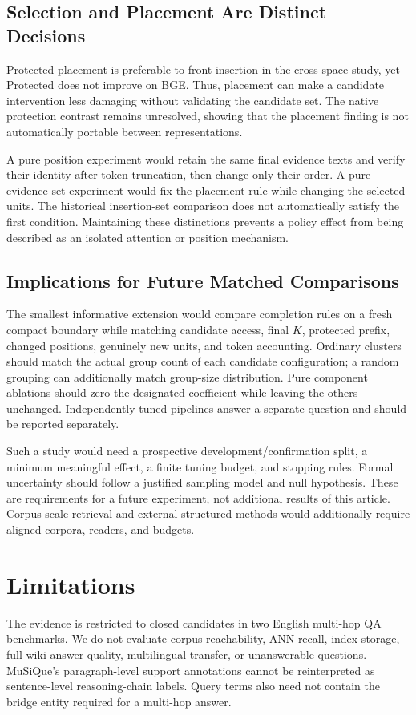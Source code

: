\documentclass[11pt,a4paper]{article}
\begin{document}
\subsection{Selection and Placement Are Distinct Decisions}
Protected placement is preferable to front insertion in the cross-space
study, yet Protected does not improve on BGE. Thus, placement can make a
candidate intervention less damaging without validating the candidate set.
The native protection contrast remains unresolved, showing that the placement
finding is not automatically portable between representations.

A pure position experiment would retain the same final evidence texts and
verify their identity after token truncation, then change only their order.
A pure evidence-set experiment would fix the placement rule while changing
the selected units. The historical insertion-set comparison does not
automatically satisfy the first condition. Maintaining these distinctions
prevents a policy effect from being described as an isolated attention or
position mechanism.

\subsection{Implications for Future Matched Comparisons}
The smallest informative extension would compare completion rules on a fresh
compact boundary while matching candidate access, final $K$, protected
prefix, changed positions, genuinely new units, and token accounting.
Ordinary clusters should match the actual group count of each candidate
configuration; a random grouping can additionally match group-size
distribution. Pure component ablations should zero the designated
coefficient while leaving the others unchanged. Independently tuned
pipelines answer a separate question and should be reported separately.

Such a study would need a prospective development/confirmation split, a
minimum meaningful effect, a finite tuning budget, and stopping rules.
Formal uncertainty should follow a justified sampling model and null
hypothesis. These are requirements for a future experiment, not additional
results of this article. Corpus-scale retrieval and external structured
methods would additionally require aligned corpora, readers, and budgets.

\section{Limitations}
The evidence is restricted to closed candidates in two English multi-hop QA
benchmarks. We do not evaluate corpus reachability, ANN recall, index
storage, full-wiki answer quality, multilingual transfer, or unanswerable
questions. MuSiQue's paragraph-level support annotations cannot be
reinterpreted as sentence-level reasoning-chain labels. Query terms also
need not contain the bridge entity required for a multi-hop answer.
\end{document}
